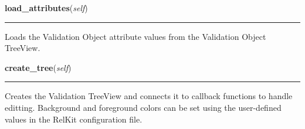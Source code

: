     \label{reliafree:validation:Validation:load_attributes}

    \vspace{0.5ex}

\hspace{.8\funcindent}\begin{boxedminipage}{\funcwidth}

    \raggedright \textbf{load\_attributes}(\textit{self})

    \vspace{-1.5ex}

    \rule{\textwidth}{0.5\fboxrule}
\setlength{\parskip}{2ex}
    Loads the Validation Object attribute values from the Validation Object
    TreeView.

\setlength{\parskip}{1ex}
    \end{boxedminipage}

    \label{reliafree:validation:Validation:create_tree}

    \vspace{0.5ex}

\hspace{.8\funcindent}\begin{boxedminipage}{\funcwidth}

    \raggedright \textbf{create\_tree}(\textit{self})

    \vspace{-1.5ex}

    \rule{\textwidth}{0.5\fboxrule}
\setlength{\parskip}{2ex}
    Creates the Validation TreeView and connects it to callback functions 
    to handle editting.  Background and foreground colors can be set using 
    the user-defined values in the RelKit configuration file.

\setlength{\parskip}{1ex}
    \end{boxedminipage}

    \label{reliafree:validation:Validation:load_tree}

    \vspace{0.5ex}

